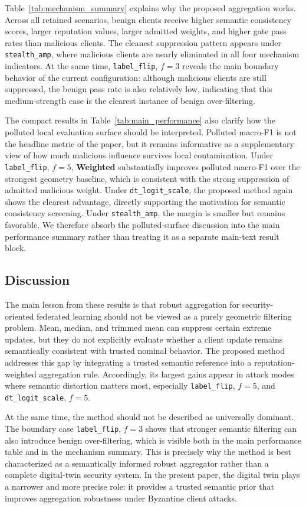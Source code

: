 Table~\ref{tab:mechanism_summary} explains why the proposed aggregation works. Across all retained scenarios, benign clients receive higher semantic consistency scores, larger reputation values, larger admitted weights, and higher gate pass rates than malicious clients. The cleanest suppression pattern appears under \texttt{stealth\_amp}, where malicious clients are nearly eliminated in all four mechanism indicators. At the same time, \texttt{label\_flip}, $f=3$ reveals the main boundary behavior of the current configuration: although malicious clients are still suppressed, the benign pass rate is also relatively low, indicating that this medium-strength case is the clearest instance of benign over-filtering.

The compact results in Table~\ref{tab:main_performance} also clarify how the polluted local evaluation surface should be interpreted. Polluted macro-F1 is not the headline metric of the paper, but it remains informative as a supplementary view of how much malicious influence survives local contamination. Under \texttt{label\_flip}, $f=5$, \textbf{Weighted} substantially improves polluted macro-F1 over the strongest geometry baseline, which is consistent with the strong suppression of admitted malicious weight. Under \texttt{dt\_logit\_scale}, the proposed method again shows the clearest advantage, directly supporting the motivation for semantic consistency screening. Under \texttt{stealth\_amp}, the margin is smaller but remains favorable. We therefore absorb the polluted-surface discussion into the main performance summary rather than treating it as a separate main-text result block.

\subsection{Discussion}\label{sec:res_discussion}
The main lesson from these results is that robust aggregation for security-oriented federated learning should not be viewed as a purely geometric filtering problem. Mean, median, and trimmed mean can suppress certain extreme updates, but they do not explicitly evaluate whether a client update remains semantically consistent with trusted nominal behavior. The proposed method addresses this gap by integrating a trusted semantic reference into a reputation-weighted aggregation rule. Accordingly, its largest gains appear in attack modes where semantic distortion matters most, especially \texttt{label\_flip}, $f=5$, and \texttt{dt\_logit\_scale}, $f=5$.

At the same time, the method should not be described as universally dominant. The boundary case \texttt{label\_flip}, $f=3$ shows that stronger semantic filtering can also introduce benign over-filtering, which is visible both in the main performance table and in the mechanism summary. This is precisely why the method is best characterized as a semantically informed robust aggregator rather than a complete digital-twin security system. In the present paper, the digital twin plays a narrower and more precise role: it provides a trusted semantic prior that improves aggregation robustness under Byzantine client attacks.
